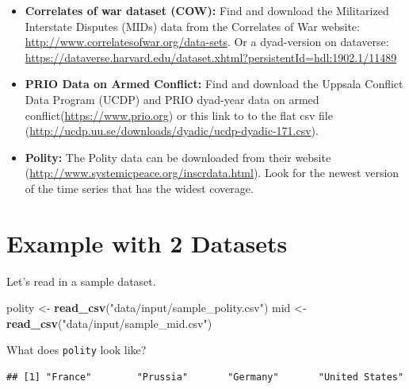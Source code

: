 \documentclass[
]{book}
\newenvironment{Shaded}{\begin{snugshade}}{\end{snugshade}}
\newcommand{\KeywordTok}[1]{\textcolor[rgb]{0.13,0.29,0.53}{\textbf{#1}}}
\newcommand{\NormalTok}[1]{#1}
\newcommand{\OperatorTok}[1]{\textcolor[rgb]{0.81,0.36,0.00}{\textbf{#1}}}
\newcommand{\StringTok}[1]{\textcolor[rgb]{0.31,0.60,0.02}{#1}}
\providecommand{\tightlist}{%
  \setlength{\itemsep}{0pt}\setlength{\parskip}{0pt}}
\theoremstyle{definition}
\theoremstyle{definition}
\theoremstyle{definition}
\theoremstyle{definition}
\theoremstyle{remark}
\begin{document}
\begin{itemize}
\tightlist
\item
  \textbf{Correlates of war dataset (COW):} Find and download the Militarized Interstate Disputes (MIDs) data from the Correlates of War website: \url{http://www.correlatesofwar.org/data-sets}. Or a dyad-version on dataverse: \url{https://dataverse.harvard.edu/dataset.xhtml?persistentId=hdl:1902.1/11489}
\item
  \textbf{PRIO Data on Armed Conflict:} Find and download the Uppsala Conflict Data Program (UCDP) and PRIO dyad-year data on armed conflict(\url{https://www.prio.org}) or this link to to the flat csv file (\url{http://ucdp.uu.se/downloads/dyadic/ucdp-dyadic-171.csv}).
\item
  \textbf{Polity:} The Polity data can be downloaded from their website (\url{http://www.systemicpeace.org/inscrdata.html}). Look for the newest version of the time series that has the widest coverage.
\end{itemize}

\hypertarget{example-with-2-datasets}{%
\section{Example with 2 Datasets}\label{example-with-2-datasets}}

Let's read in a sample dataset.

\begin{Shaded}
\begin{Highlighting}[]
\NormalTok{polity <-}\StringTok{ }\KeywordTok{read_csv}\NormalTok{(}\StringTok{"data/input/sample_polity.csv"}\NormalTok{)}
\NormalTok{mid <-}\StringTok{ }\KeywordTok{read_csv}\NormalTok{(}\StringTok{"data/input/sample_mid.csv"}\NormalTok{)}
\end{Highlighting}
\end{Shaded}

What does \texttt{polity} look like?

\begin{Shaded}
\end{Shaded}

\begin{verbatim}
## [1] "France"        "Prussia"       "Germany"       "United States"
\end{verbatim}
\end{document}
